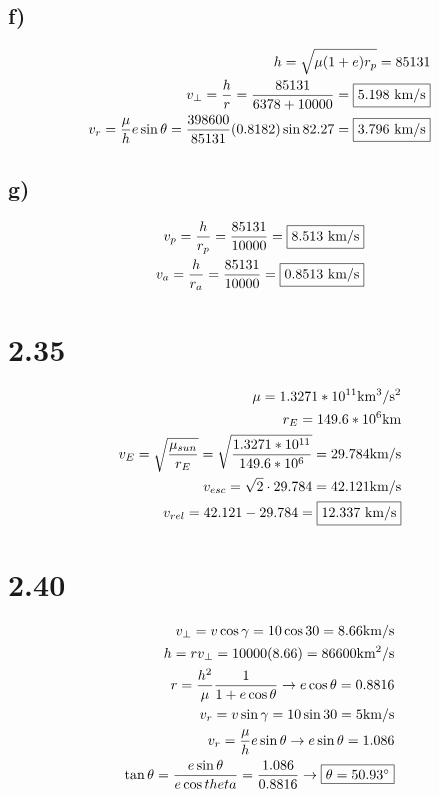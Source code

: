 \documentclass[12 pt]{article}
\begin{document}
\subsection*{f)}
\begin{align*}
    h=\sqrt{\mu(1+e)r_p}=85131 \\
    v_{\perp}=\frac{h}{r}=\frac{85131}{6378+10000}=\fbox{$5.198$ km/s} \\
    v_r=\frac{\mu}{h}e\sin{\theta}=\frac{398600}{85131}(0.8182)\sin{82.27}=\fbox{$3.796$ km/s}
\end{align*}

\subsection*{g)}
\begin{align*}
    v_p=\frac{h}{r_p}=\frac{85131}{10000}=\fbox{$8.513$ km/s} \\
    v_a=\frac{h}{r_a}=\frac{85131}{10000}=\fbox{$0.8513$ km/s}
\end{align*}

\section*{2.35}
\begin{align*}
    \mu=1.3271*10^{11}\textrm{km$^3$/s$^2$} \\
    r_E=149.6*10^6\textrm{km} \\
    v_E=\sqrt{\frac{\mu_{sun}}{r_E}}=\sqrt{\frac{1.3271*10^{11}}{149.6*10^6}}=29.784\textrm{km/s} \\
    v_{esc}=\sqrt{2}\cdot 29.784=42.121\textrm{km/s} \\
    v_{rel}=42.121-29.784=\fbox{$12.337$ km/s}
\end{align*}

\section*{2.40}
\begin{align*}
    v_{\perp}=v\cos{\gamma}=10\cos{30}=8.66\textrm{km/s} \\
    h=rv_{\perp}=10000(8.66)=86600\textrm{km$^2$/s} \\
    r=\frac{h^2}{\mu}\frac{1}{1+e\cos{\theta}}\rightarrow e\cos{\theta}=0.8816 \\
    v_r=v\sin{\gamma}=10\sin{30}=5\textrm{km/s} \\
    v_r=\frac{\mu}{h}e\sin{\theta} \rightarrow e\sin{\theta}=1.086 \\
    \tan{\theta}=\frac{e\sin{\theta}}{e\cos{theta}}=\frac{1.086}{0.8816} \rightarrow \fbox{$
    \theta = 50.93^\circ$}
\end{align*}
\end{document}
